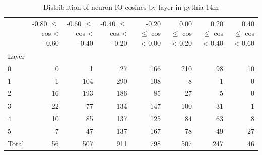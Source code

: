 \begin{table}
\caption{Distribution of neuron IO cosines by layer in pythia-14m}
\label{tab:pythia-14m_half_coarse}
\begin{tabular}{lrrrrrrr}
 & -0.80 $\leq$ cos < -0.60 & -0.60 $\leq$ cos < -0.40 & -0.40 $\leq$ cos < -0.20 & -0.20 $\leq$ cos < 0.00 & 0.00 $\leq$ cos < 0.20 & 0.20 $\leq$ cos < 0.40 & 0.40 $\leq$ cos < 0.60 \\
Layer &  &  &  &  &  &  &  \\
0 & 0 & 1 & 27 & 166 & 210 & 98 & 10 \\
1 & 1 & 104 & 290 & 108 & 8 & 1 & 0 \\
2 & 16 & 193 & 186 & 85 & 27 & 5 & 0 \\
3 & 22 & 77 & 134 & 147 & 100 & 31 & 1 \\
4 & 10 & 85 & 137 & 125 & 84 & 63 & 8 \\
5 & 7 & 47 & 137 & 167 & 78 & 49 & 27 \\
Total & 56 & 507 & 911 & 798 & 507 & 247 & 46 \\
\end{tabular}
\end{table}
